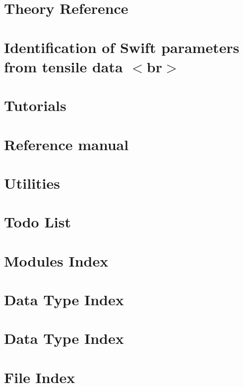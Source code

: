 \documentclass[twoside]{book}
\newcommand{\+}{\discretionary{\mbox{\scriptsize$\hookleftarrow$}}{}{}}
\begin{document}
\chapter{Theory Reference}
\label{page_theory}

\chapter{Identification of Swift parameters from tensile data \texorpdfstring{$<$}{<}br\texorpdfstring{$>$}{>}}
\label{tutorial_swift}

\chapter{Tutorials}
\label{page_tutorials}

\chapter{Reference manual}
\label{user_reference}

\chapter{Utilities}
\label{page_utilities}

\chapter{Todo List}
\label{todo}

\chapter{Modules Index}

\chapter{Data Type Index}

\chapter{Data Type Index}

\chapter{File Index}

\end{document}

